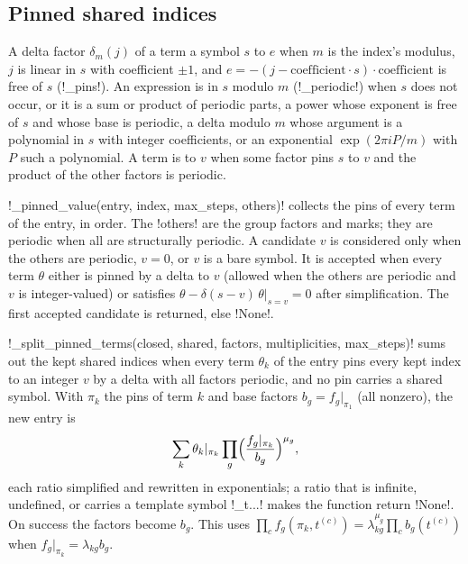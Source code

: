 \subsection{Pinned shared indices}\label{sec:semantics-symbolic-pins}

\begin{definition}\label{def:semantics-pins}
A delta factor $\delta_m(j)$ of a term  a symbol $s$ to $e$ when $m$ is the index's modulus, $j$ is linear in $s$ with coefficient $\pm1$, and $e=-(j-\text{coefficient}\cdot s)\cdot\text{coefficient}$ is free of $s$ (\py!_pins!). An expression is  in $s$ modulo $m$ (\py!_periodic!) when $s$ does not occur, or it is a sum or product of periodic parts, a power whose exponent is free of $s$ and whose base is periodic, a delta modulo $m$ whose argument is a polynomial in $s$ with integer coefficients, or an exponential $\exp(2\pi i P/m)$ with $P$ such a polynomial. A term is  to $v$ when some factor pins $s$ to $v$ and the product of the other factors is periodic.
\end{definition}

\py!_pinned_value(entry, index, max_steps, others)! collects the pins of every term of the entry, in order. The \py!others! are the group factors and marks; they are periodic when all are structurally periodic. A candidate $v$ is considered only when the others are periodic, $v=0$, or $v$ is a bare symbol. It is accepted when every term $\theta$ either is pinned by a delta to $v$ (allowed when the others are periodic and $v$ is integer-valued) or satisfies $\theta-\delta(s-v)\,\theta|_{s=v}=0$ after simplification. The first accepted candidate is returned, else \py!None!.

\py!_split_pinned_terms(closed, shared, factors, multiplicities, max_steps)! sums out the kept shared indices when every term $\theta_k$ of the entry pins every kept index to an integer $v$ by a delta with all factors periodic, and no pin carries a shared symbol. With $\pi_k$ the pins of term $k$ and base factors $b_g=f_g|_{\pi_1}$ (all nonzero), the new entry is
\[
\sum_k \theta_k|_{\pi_k}\prod_g\Bigl(\frac{f_g|_{\pi_k}}{b_g}\Bigr)^{\mu_g},
\]
each ratio simplified and rewritten in exponentials; a ratio that is infinite, undefined, or carries a template symbol \code!_t...! makes the function return \py!None!. On success the factors become $b_g$. This uses $\prod_{c}f_g(\pi_k,t^{(c)})=\lambda_{kg}^{\mu_g}\prod_c b_g(t^{(c)})$ when $f_g|_{\pi_k}=\lambda_{kg}b_g$.

